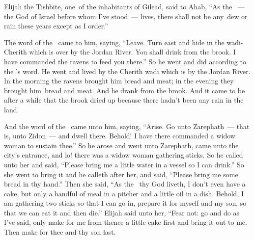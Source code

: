 
\begin{inparaenum}
   Elijah the Tishbite, one\understood\ of the inhabitants of Gilead, said to Ahab, ``As the \lord~--- the God of Israel before whom I've stood~--- lives, there shall not be any\understood\ dew or rain these years except as I order.''%
  
   The word of the \lord\ came to him, saying,%
   ``Leave. Turn east and hide in the wadi-Cherith which is over by the Jordan River.\understood%
   You shall drink from the brook. I have commanded the ravens to feed you there.''%
   So he went and did according to the \lord's word. He went and lived by the Cherith wadi which is by the Jordan River.%
   In the morning the ravens brought him bread and meat; in the evening they brought him\understood\ bread and meat. And he drank from the brook.%
   And it came to be after a while that the brook dried up because there hadn't been any rain in the land.%
  
   And the word of the \lord\ came unto him, saying,%
   ``Arise. Go unto Zarephath~--- that is, unto Zidon~--- and dwell there. Behold! I have there commanded a widow woman to sustain thee.''%
   So he arose and went unto Zarephath, came unto the city's entrance, and lo! there was a widow woman gathering sticks. So he called unto her and said, ``Please bring me a little water in a vessel so I can drink.''%
   So she went to bring it and he calleth after her, and said, ``Please bring me some bread in thy hand.''%
   Then she said, ``As the \lord\ thy God liveth, I don't even have a cake, but only a handful of meal in a pitcher and a little oil in a dish. Behold, I am gathering two sticks so that I can go in, prepare it for myself and my son, so that we can eat it and then die.''%
   Elijah said unto her, ``Fear not: go and do as I've said, only make for me from thence a little cake first and bring it out to me. Then make for thee and thy son last.%
  

\end{inparaenum}
